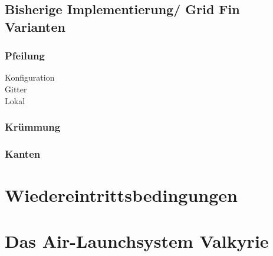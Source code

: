 \subsection{Bisherige Implementierung/ Grid Fin Varianten}
\subsubsection{Pfeilung}
Konfiguration\\
Gitter\\
Lokal\\
\subsubsection{Krümmung}
\subsubsection{Kanten}
\section{Wiedereintrittsbedingungen}

\section{Das Air-Launchsystem Valkyrie}

